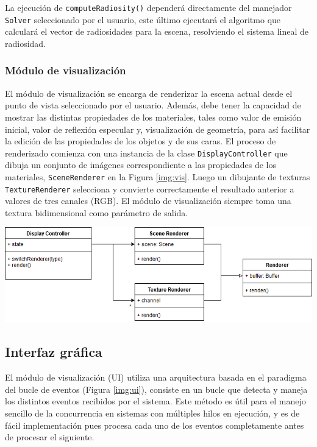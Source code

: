 La ejecución de \verb|computeRadiosity()| dependerá directamente del manejador \verb|Solver| seleccionado por el usuario, este último ejecutará el algoritmo que calculará el vector de radiosidades para la escena, resolviendo el sistema lineal de radiosidad.

\subsubsection{Módulo de visualización}

El módulo de visualización se encarga de renderizar la escena actual desde el punto de vista seleccionado por el usuario. Además, debe tener la capacidad de mostrar las distintas propiedades de los materiales, tales como valor de emisión inicial, valor de reflexión especular y, visualización de geometría, para así facilitar la edición de las propiedades de los objetos y de sus caras. El proceso de renderizado comienza con una instancia de la clase \verb|DisplayController| que dibuja un conjunto de imágenes correspondiente a las propiedades de los materiales, \verb|SceneRenderer| en la Figura \ref{img:vis}. Luego un dibujante de texturas \verb|TextureRenderer| selecciona y convierte correctamente el resultado anterior a valores de tres canales (RGB). El módulo de visualización siempre toma una textura bidimensional como parámetro de salida.

\vspace{5mm}
\begin{minipage}[h]{0.8\linewidth}
	\centering
	\includegraphics[width=\linewidth]{assets/display}
	\label{img:vis}
\end{minipage}

\subsection{Interfaz gráfica}

El módulo de visualización (UI) utiliza una arquitectura basada en el paradigma del bucle de eventos (Figura \ref{img:ui}), consiste en un bucle que detecta y maneja los distintos eventos recibidos por el sistema. Este método es útil para el manejo sencillo de la concurrencia en sistemas con múltiples hilos en ejecución, y es de fácil implementación pues procesa cada uno de los eventos completamente antes de procesar el siguiente.

